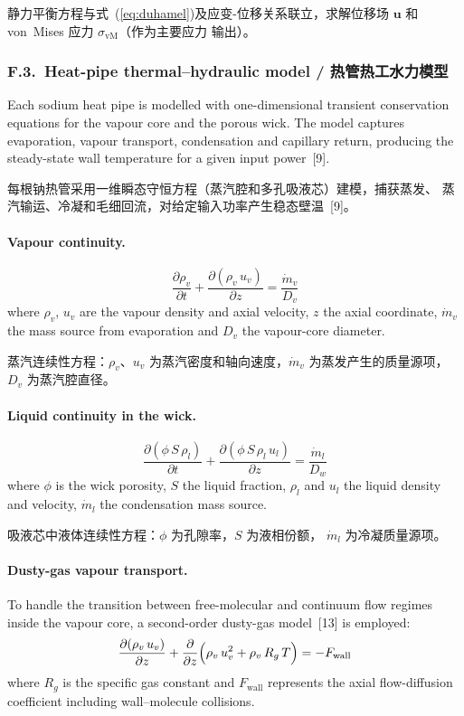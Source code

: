\documentclass[11pt,a4paper]{article}
\begin{document}
静力平衡方程与式~(\ref{eq:duhamel})及应变-位移关系联立，求解位移场
$\mathbf{u}$ 和 von~Mises 应力 $\sigma_\mathrm{vM}$（作为主要应力
输出）。


\subsubsection*{F.3.~Heat-pipe thermal--hydraulic model /
热管热工水力模型}

Each sodium heat pipe is modelled with one-dimensional transient
conservation equations for the vapour core and the porous wick. The
model captures evaporation, vapour transport, condensation and capillary
return, producing the steady-state wall temperature for a given input
power~[9].

每根钠热管采用一维瞬态守恒方程（蒸汽腔和多孔吸液芯）建模，捕获蒸发、
蒸汽输运、冷凝和毛细回流，对给定输入功率产生稳态壁温~[9]。

\paragraph{Vapour continuity.}
\begin{equation}
\frac{\partial \rho_v}{\partial t}
+ \frac{\partial(\rho_v\,u_v)}{\partial z}
= \frac{\dot{m}_v}{D_v}
\end{equation}
where $\rho_v$, $u_v$ are the vapour density and axial velocity, $z$
the axial coordinate, $\dot{m}_v$ the mass source from evaporation and
$D_v$ the vapour-core diameter.

蒸汽连续性方程：$\rho_v$、$u_v$ 为蒸汽密度和轴向速度，$\dot{m}_v$
为蒸发产生的质量源项，$D_v$ 为蒸汽腔直径。

\paragraph{Liquid continuity in the wick.}
\begin{equation}
\frac{\partial(\phi\,S\,\rho_l)}{\partial t}
+ \frac{\partial(\phi\,S\,\rho_l\,u_l)}{\partial z}
= \frac{\dot{m}_l}{D_w}
\end{equation}
where $\phi$ is the wick porosity, $S$ the liquid fraction, $\rho_l$
and $u_l$ the liquid density and velocity, $\dot{m}_l$ the condensation
mass source.

吸液芯中液体连续性方程：$\phi$ 为孔隙率，$S$ 为液相份额，
$\dot{m}_l$ 为冷凝质量源项。

\paragraph{Dusty-gas vapour transport.}
To handle the transition between free-molecular and continuum flow
regimes inside the vapour core, a second-order dusty-gas model~[13] is
employed:
\begin{equation}
\frac{\partial(\rho_v\,u_v)}{\partial z}
+ \frac{\partial}{\partial z}
  \Bigl(\rho_v\,u_v^2 + \rho_v\,R_g\,T\Bigr)
= -F_\mathrm{wall}
\end{equation}
where $R_g$ is the specific gas constant and $F_\mathrm{wall}$
represents the axial flow-diffusion coefficient including wall--molecule
collisions.
\end{document}
